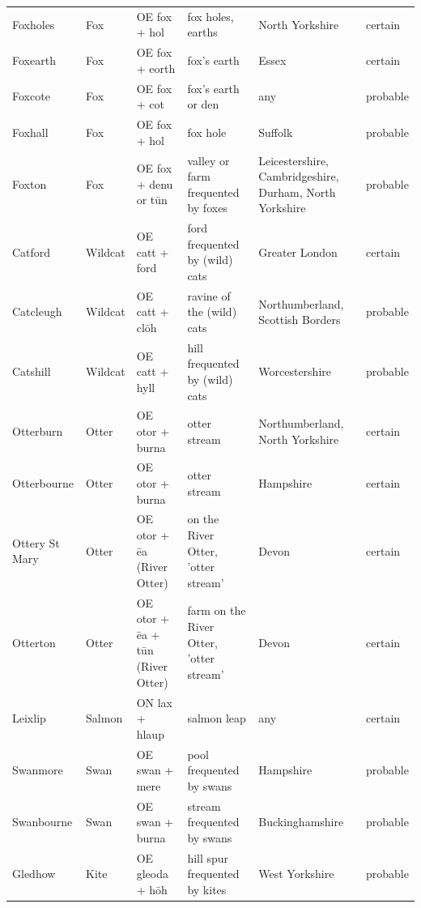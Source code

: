 \documentclass[11pt,a4paper]{article}
\begin{document}
\begin{small}
\begin{longtable}{R{2.2cm}R{1.3cm}R{2.6cm}R{3.7cm}R{2.7cm}l}
Foxholes & Fox & OE fox + hol & fox holes, earths & North Yorkshire & certain\\
Foxearth & Fox & OE fox + eorth & fox's earth & Essex & certain\\
Foxcote & Fox & OE fox + cot & fox's earth or den & any & probable\\
Foxhall & Fox & OE fox + hol & fox hole & Suffolk & probable\\
Foxton & Fox & OE fox + denu or tūn & valley or farm frequented by foxes & Leicestershire, Cambridgeshire, Durham, North Yorkshire & probable\\
Catford & Wildcat & OE catt + ford & ford frequented by (wild) cats & Greater London & certain\\
Catcleugh & Wildcat & OE catt + clōh & ravine of the (wild) cats & Northumberland, Scottish Borders & probable\\
Catshill & Wildcat & OE catt + hyll & hill frequented by (wild) cats & Worcestershire & probable\\
Otterburn & Otter & OE otor + burna & otter stream & Northumberland, North Yorkshire & certain\\
Otterbourne & Otter & OE otor + burna & otter stream & Hampshire & certain\\
Ottery St Mary & Otter & OE otor + ēa (River Otter) & on the River Otter, 'otter stream' & Devon & certain\\
Otterton & Otter & OE otor + ēa + tūn (River Otter) & farm on the River Otter, 'otter stream' & Devon & certain\\
Leixlip & Salmon & ON lax + hlaup & salmon leap & any & certain\\
Swanmore & Swan & OE swan + mere & pool frequented by swans & Hampshire & probable\\
Swanbourne & Swan & OE swan + burna & stream frequented by swans & Buckinghamshire & probable\\
Gledhow & Kite & OE gleoda + hōh & hill spur frequented by kites & West Yorkshire & probable\\
\bottomrule\end{longtable}\end{small}
\end{document}
